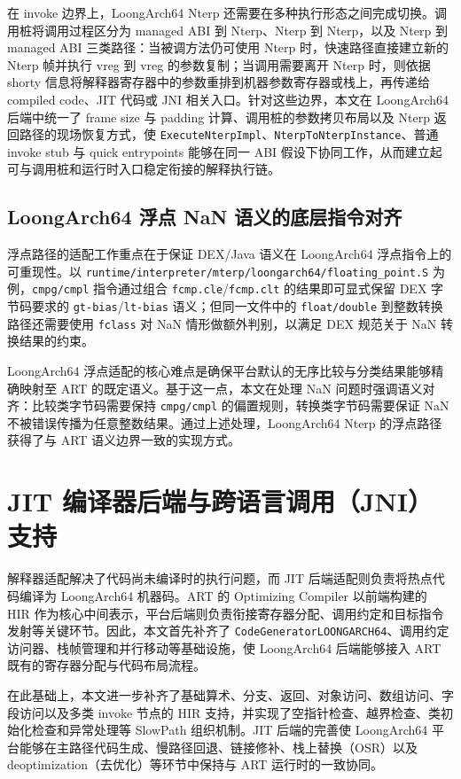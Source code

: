 在 invoke 边界上，LoongArch64 Nterp 还需要在多种执行形态之间完成切换。调用桩将调用过程区分为 managed ABI 到 Nterp、Nterp 到 Nterp，以及 Nterp 到 managed ABI 三类路径：当被调方法仍可使用 Nterp 时，快速路径直接建立新的 Nterp 帧并执行 vreg 到 vreg 的参数复制；当调用需要离开 Nterp 时，则依据 shorty 信息将解释器寄存器中的参数重排到机器参数寄存器或栈上，再传递给 compiled code、JIT 代码或 JNI 相关入口。针对这些边界，本文在 LoongArch64 后端中统一了 frame size 与 padding 计算、调用桩的参数拷贝布局以及 Nterp 返回路径的现场恢复方式，使 \texttt{ExecuteNterpImpl}、\texttt{NterpToNterpInstance}、普通 invoke stub 与 quick entrypoints 能够在同一 ABI 假设下协同工作，从而建立起可与调用桩和运行时入口稳定衔接的解释执行链。

\subsection{LoongArch64 浮点 NaN 语义的底层指令对齐}

浮点路径的适配工作重点在于保证 DEX/Java 语义在 LoongArch64 浮点指令上的可重现性。以 \texttt{runtime/interpreter/mterp/loongarch64/floating\_point.S} 为例，\texttt{cmpg/cmpl} 指令通过组合 \texttt{fcmp.cle}/\texttt{fcmp.clt} 的结果即可显式保留 DEX 字节码要求的 \texttt{gt-bias}/\texttt{lt-bias} 语义；但同一文件中的 \texttt{float/double} 到整数转换路径还需要使用 \texttt{fclass} 对 NaN 情形做额外判别，以满足 DEX 规范关于 NaN 转换结果的约束。

LoongArch64 浮点适配的核心难点是确保平台默认的无序比较与分类结果能够精确映射至 ART 的既定语义。基于这一点，本文在处理 NaN 问题时强调语义对齐：比较类字节码需要保持 \texttt{cmpg/cmpl} 的偏置规则，转换类字节码需要保证 NaN 不被错误传播为任意整数结果。通过上述处理，LoongArch64 Nterp 的浮点路径获得了与 ART 语义边界一致的实现方式。

\section{JIT 编译器后端与跨语言调用（JNI）支持}

解释器适配解决了代码尚未编译时的执行问题，而 JIT 后端适配则负责将热点代码编译为 LoongArch64 机器码。ART 的 Optimizing Compiler 以前端构建的 HIR 作为核心中间表示，平台后端则负责衔接寄存器分配、调用约定和目标指令发射等关键环节。因此，本文首先补齐了 \texttt{CodeGeneratorLOONGARCH64}、调用约定访问器、栈帧管理和并行移动等基础设施，使 LoongArch64 后端能够接入 ART 既有的寄存器分配与代码布局流程。

在此基础上，本文进一步补齐了基础算术、分支、返回、对象访问、数组访问、字段访问以及多类 invoke 节点的 HIR 支持，并实现了空指针检查、越界检查、类初始化检查和异常处理等 SlowPath 组织机制。JIT 后端的完善使 LoongArch64 平台能够在主路径代码生成、慢路径回退、链接修补、栈上替换（OSR）以及 deoptimization（去优化）等环节中保持与 ART 运行时的一致协同\citep{Fink2003,Lameed2013}。

